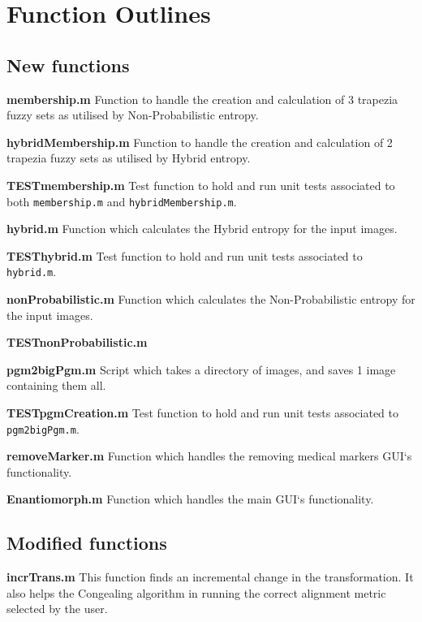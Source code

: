 \chapter{Function Outlines}
\label{appendix:code}

\section{New functions}

\noindent \textbf{membership.m}
Function to handle the creation and calculation of 3 trapezia fuzzy sets as utilised by Non-Probabilistic entropy.

\noindent \textbf{hybridMembership.m}
Function to handle the creation and calculation of 2 trapezia fuzzy sets as utilised by Hybrid entropy.

\noindent \textbf{TESTmembership.m}
Test function to hold and run unit tests associated to both \texttt{membership.m} and \texttt{hybridMembership.m}.

\noindent \textbf{hybrid.m}
Function which calculates the Hybrid entropy for the input images.

\noindent \textbf{TESThybrid.m}
Test function to hold and run unit tests associated to \texttt{hybrid.m}.

\noindent \textbf{nonProbabilistic.m}
Function which calculates the Non-Probabilistic entropy for the input images.

\noindent \textbf{TESTnonProbabilistic.m}

\noindent \textbf{pgm2bigPgm.m}
Script which takes a directory of images, and saves 1 image containing them all.

\noindent \textbf{TESTpgmCreation.m}
Test function to hold and run unit tests associated to \texttt{pgm2bigPgm.m}.

\noindent \textbf{removeMarker.m}
Function which handles the removing medical markers \acrshort{GUI}`s functionality.

\noindent \textbf{Enantiomorph.m}
Function which handles the main \acrshort{GUI}`s functionality.

\section{Modified functions}

\noindent \textbf{incrTrans.m}
This function finds an incremental change in the transformation. It also helps the \Gls{Congealing} algorithm in running the correct alignment metric selected by the user.

